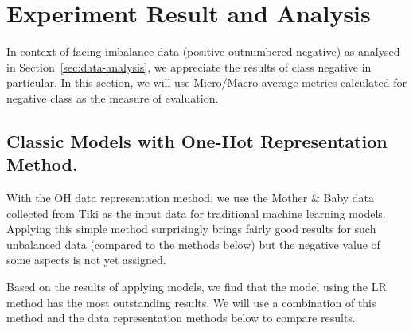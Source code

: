 \section{Experiment Result and Analysis}
\label{sec:experiment-result}

In context of facing imbalance data (positive outnumbered negative) as analysed in Section~\ref{sec:data-analysis}, we appreciate the results of class negative in particular. 
In this section, we will use  Micro/Macro-average metrics calculated for negative class as the measure of evaluation.
\subsection{Classic Models with One-Hot Representation Method.}
With the OH data representation method, we use the Mother \& Baby data collected from Tiki as the input data for traditional machine learning models. Applying this simple method surprisingly brings fairly good results for such unbalanced data (compared to the methods below) but the negative value of some aspects is not yet assigned.

Based on the results of applying models, we find that the model using the LR method has the most outstanding results. We will use a combination of this method and the data representation methods below to compare results.


